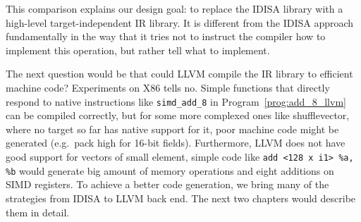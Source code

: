 This comparison explains our design goal: to replace the IDISA library with a high-level target-independent IR library. It is different from the IDISA approach fundamentally in the way that it tries not to instruct the compiler how to implement this operation, but rather tell what to implement.

The next question would be that could LLVM compile the IR library to efficient machine code? Experiments on X86 tells no. Simple functions that directly respond to native instructions like {\tt simd\_add\_8} in Program~\ref{prog:add_8_llvm} can be compiled correctly, but for some more complexed ones like shufflevector, where no target so far has native support for it, poor machine code might be generated (e.g.\ pack high for 16-bit fields). Furthermore, LLVM does not have good support for vectors of small element, simple code like \verb|add <128 x i1> %a, %b| would generate big amount of memory operations and eight additions on SIMD registers. To achieve a better code generation, we bring many of the strategies from IDISA to LLVM back end. The next two chapters would describe them in detail.

